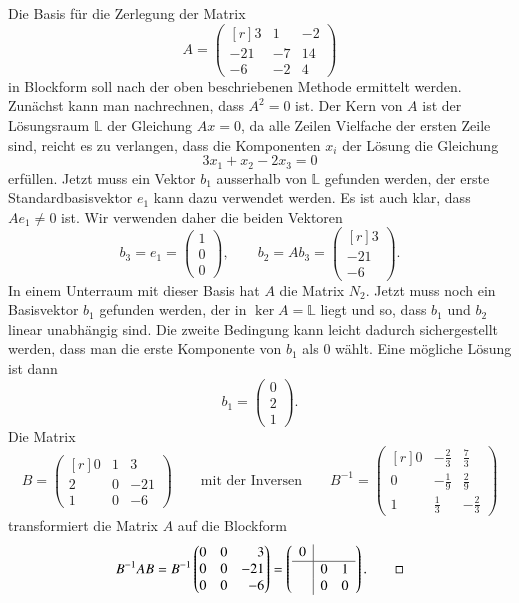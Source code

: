 \begin{beispiel}
Die Basis für die Zerlegung der Matrix
\[
A
=
\begin{pmatrix*}[r]
  3& 1&-2\\
-21&-7&14\\
 -6&-2& 4
\end{pmatrix*}
\]
in Blockform soll nach der oben beschriebenen Methode ermittelt werden.
Zunächst kann man nachrechnen, dass $A^2=0$ ist.
Der Kern von $A$ ist der Lösungsraum $\mathbb{L}$ der Gleichung $Ax=0$,
da alle Zeilen
Vielfache der ersten Zeile sind, reicht es zu verlangen, dass die
Komponenten $x_i$ der Lösung die Gleichung
\[
3x_1+x_2-2x_3=0
\]
erfüllen.
Jetzt muss ein Vektor $b_1$ ausserhalb von $\mathbb{L}$ gefunden werden,
der erste Standardbasisvektor $e_1$ kann dazu verwendet werden.
Es ist auch klar, dass $Ae_1\ne 0$ ist.
Wir verwenden daher die beiden Vektoren 
\[
b_3=e_1=\begin{pmatrix} 1\\0\\0 \end{pmatrix}
,\qquad
b_2=Ab_3=\begin{pmatrix*}[r] 3\\-21\\-6 \end{pmatrix*}.
\]
In einem Unterraum mit
dieser Basis hat $A$ die Matrix $N_2$.
Jetzt muss noch ein Basisvektor $b_1$ gefunden werden,
der in $\ker A=\mathbb{L}$ liegt und so, dass $b_1$ und $b_2$ 
linear unabhängig sind.
Die zweite Bedingung kann leicht dadurch sichergestellt werden,
dass man die erste Komponente von $b_1$ als $0$ wählt.
Eine mögliche Lösung ist dann
\[
b_1=\begin{pmatrix}0\\2\\1\end{pmatrix}.
\]
Die Matrix 
\[
B=\begin{pmatrix*}[r]
 0& 1&   3\\
 2& 0& -21\\
 1& 0&  -6
\end{pmatrix*}
\qquad\text{mit der Inversen}
\qquad
B^{-1}=\begin{pmatrix*}[r]
0&-\frac23& \frac73\\
0&-\frac19& \frac29\\
1& \frac13&-\frac23
\end{pmatrix*}
\]
transformiert die Matrix $A$ auf die Blockform
\[
B^{-1}AB
=
B^{-1}\begin{pmatrix*}[r]
0&0&  3\\
0&0&-21\\
0&0& -6
\end{pmatrix*}
=
\left(
\begin{array}{c|cc}
0& & \\
\hline
 &0&1\\
 &0&0
\end{array}
\right).
\qedhere
\]
\end{beispiel}

